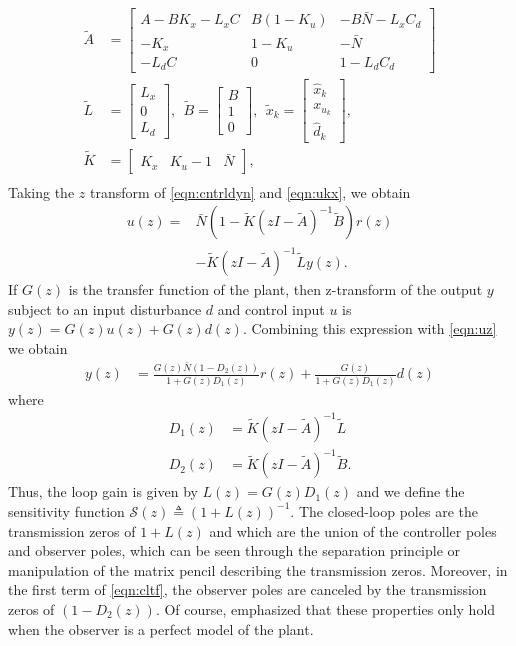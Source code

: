 \documentclass[journal,twocolumn,twoside]{IEEEtran}
\begin{document}
\begin{align*}
  \tilde{A} &= \begin{bmatrix}
    A-BK_x-L_xC & B(1-K_u) & -B\bar{N} - L_xC_d\\
    -K_x        & 1-K_u    & -\bar{N} \\
    -L_dC      & 0        & 1-L_dC_d
  \end{bmatrix}\\
  \tilde{L} &= \begin{bmatrix} L_x \\ 0 \\ L_d  \end{bmatrix},\:\:
  \tilde{B} = \begin{bmatrix} B \\ 1 \\0\end{bmatrix},\:\:
  \tilde{x}_k = \begin{bmatrix} \hat{x}_k \\ x_{u_k} \\ \hat{d}_k\end{bmatrix},\\
  \tilde{K} &= \begin{bmatrix}K_x & K_u-1 & \bar{N}\end{bmatrix},\\
\end{align*}
Taking the $z$ transform of \eqref{eqn:cntrldyn} and \eqref{eqn:ukx}, we obtain
\begin{align}
  u(z) =&  \bar{N}(1-\tilde{K}(zI-\tilde{A})^{-1}\tilde{B})r(z) \label{eqn:uz}\\
       & -\tilde{K}(zI - \tilde{A})^{-1}\tilde{L}y(z).\nonumber
\end{align}
If $G(z)$ is the transfer function of the plant, then z-transform of the output $y$ subject to an input disturbance $d$ and control input $u$ is $y(z) = G(z)u(z) + G(z)d(z)$. Combining this expression with \eqref{eqn:uz} we obtain 
\begin{align}
  y(z) &= \frac{G(z)\bar{N}(1-D_2(z))}{1 + G(z)D_1(z)} r(z) + \frac{G(z)}{1 + G(z)D_1(z)}d(z)\label{eqn:cltf}
\end{align}
where
\begin{align}
  D_1(z) &= \tilde{K}(zI -\tilde{A})^{-1}\tilde{L}\\
  D_2(z) &= \tilde{K}(zI -\tilde{A})^{-1}\tilde{B}.
\end{align}
Thus, the loop gain is given by $L(z) = G(z)D_1(z)$ and we define the sensitivity function $\mathcal{S}(z)\triangleq (1+L(z))^{-1}$. The closed-loop poles are the transmission zeros of $1+L(z)$ and which are the union of the controller poles and observer poles, which can be seen through the separation principle or manipulation of the matrix pencil describing the transmission zeros. Moreover, in the first term of \eqref{eqn:cltf}, the observer poles are canceled by the transmission zeros of $(1-D_2(z))$. Of course, emphasized that these properties only hold when the observer is a perfect model of the plant. 
\end{document}
